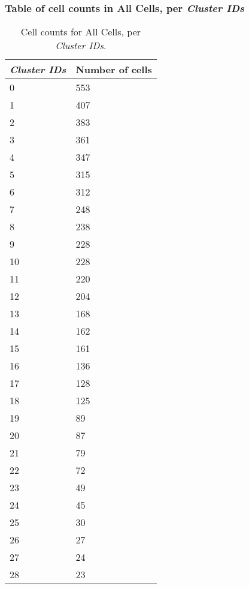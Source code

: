\subsubsection{Table of cell counts in All Cells, per \emph{Cluster IDs}}\begin{table}[h]
\centering
\label{my-label}
\begin{tabular}{@{}ll@{}}
\toprule

\emph{Cluster IDs}& Number of cells \\ \midrule
0 & 553 \\

1 & 407 \\

2 & 383 \\

3 & 361 \\

4 & 347 \\

5 & 315 \\

6 & 312 \\

7 & 248 \\

8 & 238 \\

9 & 228 \\

10 & 228 \\

11 & 220 \\

12 & 204 \\

13 & 168 \\

14 & 162 \\

15 & 161 \\

16 & 136 \\

17 & 128 \\

18 & 125 \\

19 & 89 \\

20 & 87 \\

21 & 79 \\

22 & 72 \\

23 & 49 \\

24 & 45 \\

25 & 30 \\

26 & 27 \\

27 & 24 \\

28 & 23 \\
\bottomrule
\end{tabular}
\caption{Cell counts for All Cells, per \emph{Cluster IDs}.}
\end{table}

